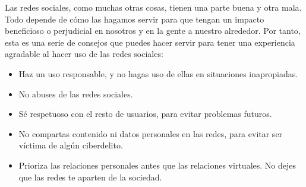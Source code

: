 \documentclass[12pt,a4paper]{article}
\begin{document}
Las redes sociales, como muchas otras cosas, tienen una parte buena y otra mala. Todo depende de cómo las hagamos servir para que tengan un impacto beneficioso o perjudicial en nosotros y en la gente a nuestro alrededor. Por tanto, esta es una serie de consejos que puedes hacer servir para tener una experiencia agradable al hacer uso de las redes sociales:

\begin{itemize}
	\item Haz un uso responsable, y no hagas uso de ellas en situaciones inapropiadas.
	\item No abuses de las redes sociales.
	\item Sé respetuoso con el resto de usuarios, para evitar problemas futuros.
	\item No compartas contenido ni datos personales en las redes, para evitar ser víctima de algún ciberdelito.
	\item Prioriza las relaciones personales antes que las relaciones virtuales. No dejes que las redes te aparten de la sociedad.
\end{itemize}
\end{document}
